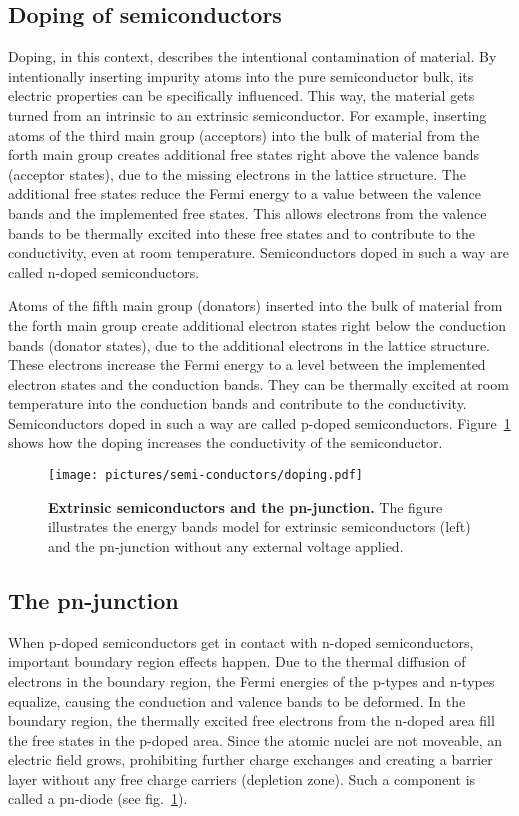 \subsection{Doping of semiconductors}
Doping, in this context, describes the intentional contamination of material. By intentionally inserting impurity atoms into the pure semiconductor bulk, its electric properties can be specifically influenced. This way, the material gets turned from an intrinsic to an extrinsic semiconductor. For example, inserting atoms of the third main group (acceptors) into the bulk of material from the forth main group creates additional free states right above the valence bands (acceptor states), due to the missing electrons in the lattice structure. The additional free states reduce the Fermi energy to a value between the valence bands and the implemented free states. This allows electrons from the valence bands to be thermally excited into these free states and to contribute to the conductivity, even at room temperature. Semiconductors doped in such a way are called n-doped semiconductors.

Atoms of the fifth main group (donators) inserted into the bulk of material from the forth main group create additional electron states right below the conduction bands (donator states), due to the additional electrons in the lattice structure. These electrons increase the Fermi energy to a level between the implemented electron states and the conduction bands. They can be thermally excited at room temperature into the conduction bands and contribute to the conductivity. Semiconductors doped in such a way are called p-doped semiconductors. Figure~\ref{fig:doping} shows how the doping increases the conductivity of the semiconductor.
\begin{figure}
\begin{center}
\texttt{[image: pictures/semi-conductors/doping.pdf]}
\end{center}
\caption[Extrinsic semiconductors and the pn-junction]{\textbf{Extrinsic semiconductors and the pn-junction.} The figure illustrates the energy bands model for extrinsic semiconductors (left) and the pn-junction without any external voltage applied.}\label{fig:doping}
\end{figure}


\subsection{The pn-junction}
When p-doped semiconductors get in contact with n-doped semiconductors, important boundary region effects happen. Due to the thermal diffusion of electrons in the boundary region, the Fermi energies of the p-types and n-types equalize, causing the conduction and valence bands to be deformed. In the boundary region, the thermally excited free electrons from the n-doped area fill the free states in the p-doped area. Since the atomic nuclei are not moveable, an electric field grows, prohibiting further charge exchanges and creating a barrier layer without any free charge carriers (depletion zone). Such a component is called a pn-diode (see fig.~\ref{fig:doping}).

